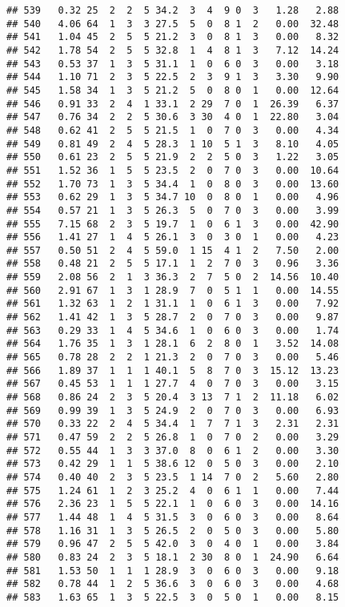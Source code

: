 \documentclass[
]{article}
\begin{document}
\begin{verbatim}
## 539   0.32 25  2  2  5 34.2  3  4  9 0  3   1.28   2.88
## 540   4.06 64  1  3  3 27.5  5  0  8 1  2   0.00  32.48
## 541   1.04 45  2  5  5 21.2  3  0  8 1  3   0.00   8.32
## 542   1.78 54  2  5  5 32.8  1  4  8 1  3   7.12  14.24
## 543   0.53 37  1  3  5 31.1  1  0  6 0  3   0.00   3.18
## 544   1.10 71  2  3  5 22.5  2  3  9 1  3   3.30   9.90
## 545   1.58 34  1  3  5 21.2  5  0  8 0  1   0.00  12.64
## 546   0.91 33  2  4  1 33.1  2 29  7 0  1  26.39   6.37
## 547   0.76 34  2  2  5 30.6  3 30  4 0  1  22.80   3.04
## 548   0.62 41  2  5  5 21.5  1  0  7 0  3   0.00   4.34
## 549   0.81 49  2  4  5 28.3  1 10  5 1  3   8.10   4.05
## 550   0.61 23  2  5  5 21.9  2  2  5 0  3   1.22   3.05
## 551   1.52 36  1  5  5 23.5  2  0  7 0  3   0.00  10.64
## 552   1.70 73  1  3  5 34.4  1  0  8 0  3   0.00  13.60
## 553   0.62 29  1  3  5 34.7 10  0  8 0  1   0.00   4.96
## 554   0.57 21  1  3  5 26.3  5  0  7 0  3   0.00   3.99
## 555   7.15 68  2  3  5 19.7  1  0  6 1  3   0.00  42.90
## 556   1.41 27  1  4  5 26.1  3  0  3 0  1   0.00   4.23
## 557   0.50 51  2  4  5 59.0  1 15  4 1  2   7.50   2.00
## 558   0.48 21  2  5  5 17.1  1  2  7 0  3   0.96   3.36
## 559   2.08 56  2  1  3 36.3  2  7  5 0  2  14.56  10.40
## 560   2.91 67  1  3  1 28.9  7  0  5 1  1   0.00  14.55
## 561   1.32 63  1  2  1 31.1  1  0  6 1  3   0.00   7.92
## 562   1.41 42  1  3  5 28.7  2  0  7 0  3   0.00   9.87
## 563   0.29 33  1  4  5 34.6  1  0  6 0  3   0.00   1.74
## 564   1.76 35  1  3  1 28.1  6  2  8 0  1   3.52  14.08
## 565   0.78 28  2  2  1 21.3  2  0  7 0  3   0.00   5.46
## 566   1.89 37  1  1  1 40.1  5  8  7 0  3  15.12  13.23
## 567   0.45 53  1  1  1 27.7  4  0  7 0  3   0.00   3.15
## 568   0.86 24  2  3  5 20.4  3 13  7 1  2  11.18   6.02
## 569   0.99 39  1  3  5 24.9  2  0  7 0  3   0.00   6.93
## 570   0.33 22  2  4  5 34.4  1  7  7 1  3   2.31   2.31
## 571   0.47 59  2  2  5 26.8  1  0  7 0  2   0.00   3.29
## 572   0.55 44  1  3  3 37.0  8  0  6 1  2   0.00   3.30
## 573   0.42 29  1  1  5 38.6 12  0  5 0  3   0.00   2.10
## 574   0.40 40  2  3  5 23.5  1 14  7 0  2   5.60   2.80
## 575   1.24 61  1  2  3 25.2  4  0  6 1  1   0.00   7.44
## 576   2.36 23  1  5  5 22.1  1  0  6 0  3   0.00  14.16
## 577   1.44 48  1  4  5 31.5  3  0  6 0  3   0.00   8.64
## 578   1.16 31  1  3  5 26.5  2  0  5 0  3   0.00   5.80
## 579   0.96 47  2  5  5 42.0  3  0  4 0  1   0.00   3.84
## 580   0.83 24  2  3  5 18.1  2 30  8 0  1  24.90   6.64
## 581   1.53 50  1  1  1 28.9  3  0  6 0  3   0.00   9.18
## 582   0.78 44  1  2  5 36.6  3  0  6 0  3   0.00   4.68
## 583   1.63 65  1  3  5 22.5  3  0  5 0  1   0.00   8.15

\end{verbatim}
\end{document}
